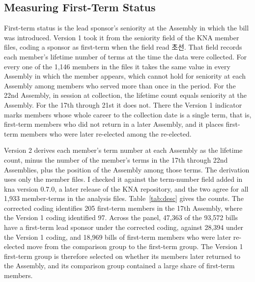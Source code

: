 \documentclass[11pt]{article}
\begin{document}
\subsection{Measuring First-Term Status}
\label{sec:coding}

First-term status is the lead sponsor's seniority at the Assembly in which the bill was introduced. Version 1 took it from the seniority field of the KNA member files, coding a sponsor as first-term when the field read 초선. That field records each member's lifetime number of terms at the time the data were collected. For every one of the 1,146 members in the files it takes the same value in every Assembly in which the member appears, which cannot hold for seniority at each Assembly among members who served more than once in the period. For the 22nd Assembly, in session at collection, the lifetime count equals seniority at the Assembly. For the 17th through 21st it does not. There the Version 1 indicator marks members whose whole career to the collection date is a single term, that is, first-term members who did not return in a later Assembly, and it places first-term members who were later re-elected among the re-elected.

Version 2 derives each member's term number at each Assembly as the lifetime count, minus the number of the member's terms in the 17th through 22nd Assemblies, plus the position of the Assembly among those terms. The derivation uses only the member files. I checked it against the term-number field added in kna version 0.7.0, a later release of the KNA repository, and the two agree for all 1,933 member-terms in the analysis files. Table~\ref{tab:desc} gives the counts. The corrected coding identifies 205 first-term members in the 17th Assembly, where the Version 1 coding identified 97. Across the panel, 47,363 of the 93,572 bills have a first-term lead sponsor under the corrected coding, against 28,394 under the Version 1 coding, and 18,969 bills of first-term members who were later re-elected move from the comparison group to the first-term group. The Version 1 first-term group is therefore selected on whether its members later returned to the Assembly, and its comparison group contained a large share of first-term members.
\end{document}

